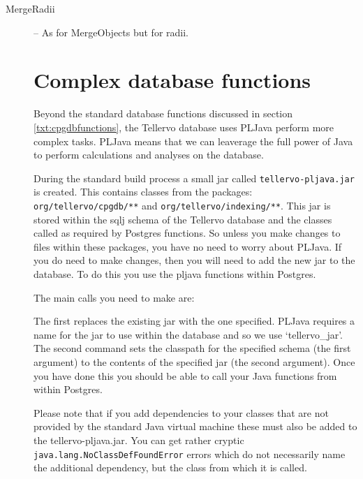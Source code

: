 \begin{description}
 \item[MergeRadii] -- As for MergeObjects but for radii.



\section{Complex database functions}
Beyond the standard database functions discussed in section \ref{txt:cpgdbfunctions}, the Tellervo database uses PLJava perform more complex tasks.  PLJava means that we can leaverage the full power of Java to perform calculations and analyses on the database.  

During the standard build process a small jar called \verb|tellervo-pljava.jar| is created.  This contains classes from the packages: \verb|org/tellervo/cpgdb/**| and \verb |org/tellervo/indexing/**|.  This jar is stored within the sqlj schema of the Tellervo database and the classes called as required by Postgres functions.  So unless you make changes to files within these packages, you have no need to worry about PLJava.  If you do need to make changes, then you will need to add the new jar to the database.  To do this you use the pljava functions within Postgres.  

The main calls you need to make are: 
 
The first replaces the existing jar with the one specified.  PLJava requires a name for the jar to use within the database and so we use `tellervo_jar'.  The second command sets the classpath for the specified schema (the first argument) to the contents of the specified jar (the second argument).  Once you have done this you should be able to call your Java functions from within Postgres.

Please note that if you add dependencies to your classes that are not provided by the standard Java virtual machine these must also be added to the tellervo-pljava.jar.  You can get rather cryptic \verb|java.lang.NoClassDefFoundError| errors which do not necessarily name the additional dependency, but the class from which it is called.



\end{description}